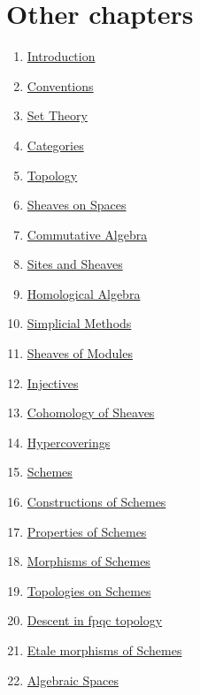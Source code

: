 \section{Other chapters}

\begin{multicols}{2}
\begin{enumerate}
\item \hyperref[introduction-section-overview]{Introduction}
\item \hyperref[conventions-section-comments]{Conventions}
\item \hyperref[sets-section-introduction]{Set Theory}
\item \hyperref[categories-section-introduction]{Categories}
\item \hyperref[topology-section-introduction]{Topology}
\item \hyperref[sheaves-section-introduction]{Sheaves on Spaces}
\item \hyperref[algebra-section-introduction]{Commutative Algebra}
\item \hyperref[sites-section-introduction]{Sites and Sheaves}
\item \hyperref[homology-section-introduction]{Homological Algebra}
\item \hyperref[simplicial-section-introduction]{Simplicial Methods}
\item \hyperref[modules-section-introduction]{Sheaves of Modules}
\item \hyperref[injectives-section-introduction]{Injectives}
\item \hyperref[cohomology-section-introduction]{Cohomology of Sheaves}
\item \hyperref[hypercovering-section-introduction]{Hypercoverings}
\item \hyperref[schemes-section-introduction]{Schemes}
\item \hyperref[constructions-section-introduction]{Constructions of Schemes}
\item \hyperref[properties-section-introduction]{Properties of Schemes}
\item \hyperref[morphisms-section-introduction]{Morphisms of Schemes}
\item \hyperref[topologies-section-introduction]{Topologies on Schemes}
\item \hyperref[fpqc-descent-section-introduction]{Descent in fpqc topology}
\item \hyperref[etale-section-introduction]{Etale morphisms of Schemes}
\item \hyperref[spaces-section-introduction]{Algebraic Spaces}

\end{enumerate}
\end{multicols}
